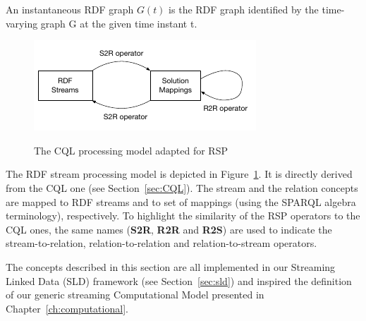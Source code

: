 \begin{Definition}
An instantaneous RDF graph $G(t)$ is the RDF graph identified by the time-varying graph G at the given time instant t.
\end{Definition}

\begin{figure}[h]
  \begin{center}
    \includegraphics[width=.65\textwidth]{img/cql-rdf-model}\\
    \caption{The CQL processing model adapted for RSP}
    \label{fig:cql-rdf-model}
  \end{center}
\end{figure}

The RDF stream processing model is depicted in Figure~\ref{fig:cql-rdf-model}. It is directly derived from the CQL one (see Section~\ref{sec:CQL}). The stream and the relation concepts are mapped to RDF streams and to set of mappings (using the SPARQL algebra terminology), respectively. To highlight the similarity of the RSP operators \cite{DBLP:journals/ijswis/DellAglioVCC14} to the CQL ones, the same names (\textbf{S2R}, \textbf{R2R} and \textbf{R2S}) are used to indicate the stream-to-relation, relation-to-relation and relation-to-stream operators. 

The concepts described in this section are all implemented in our Streaming Linked Data (SLD) framework (see Section~\ref{sec:sld}) and inspired the definition of our generic streaming Computational Model presented in Chapter~\ref{ch:computational}. 


